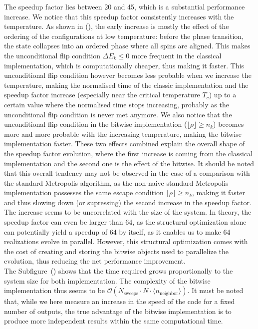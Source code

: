 The speedup factor lies between 20 and 45, which is a substantial performance increase. We notice that this speedup factor consistently increases with the temperature. As shown in (), the early increase is mostly the effect of the ordering of the configurations at low temperature: before the phase transition, the state collapses into an ordered phase where all spins are aligned. This makes the unconditional flip condition $\Delta E_k \leq 0$ more frequent in the classical implementation, which is computationally cheaper, thus making it faster. This unconditional flip condition however becomes less probable when we increase the temperature, making the normalised time of the classic implementation and the speedup factor increase (especially near the critical temperature $T_c$) up to a certain value where the normalised time stops increasing, probably as the unconditional flip condition is never met anymore. We also notice that the unconditional flip condition in the bitwise implementation ($\lfloor \rho \rfloor \geq n_k$) becomes more and more probable with the increasing temperature, making the bitwise implementation faster. These two effects combined explain the overall shape of the speedup factor evolution, where the first increase is coming from the classical implementation and the second one is the effect of the bitwise. It should be noted that this overall tendency may not be observed in the case of a comparison with the standard Metropolis algorithm, as the non-naive standard Metropolis implementation possesses the same escape condition $\lfloor \rho \rfloor \geq n_k$, making it faster and thus slowing down (or supressing) the second increase in the speedup factor. \\
The increase seems to be uncorrelated with the size of the system. In theory, the speedup factor can even be larger than 64, as the structural optimization alone can potentially yield a speedup of 64 by itself, as it enables us to make 64 realizations evolve in parallel. However, this structural optimization comes with the cost of creating and storing the bitwise objects used to parallelize the evolution, thus reducing the net performance improvement.\\
The Subfigure~() shows that the time required grows proportionally to the system size for both implementation. The complexity of the bitwise implementation thus seems to be $\mathcal{O}\left(N_\text{sweeps} \cdot  N \cdot \langle n_\text{neighbor} \rangle \right)$.
It must be noted that, while we here measure an increase in the speed of the code for a fixed number of outputs, the true advantage of the bitwise implementation is to produce more independent results within the same computational time.
